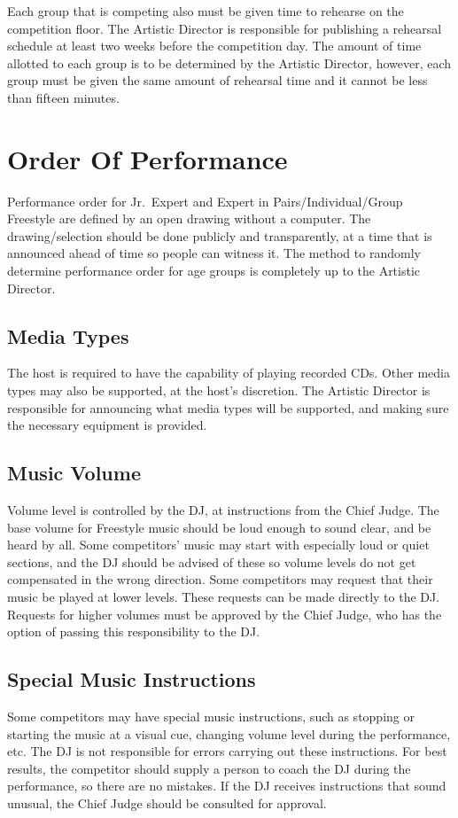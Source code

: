Each group that is competing also must be given time to rehearse on the competition floor.
The Artistic Director is responsible for publishing a rehearsal schedule at least two weeks before the competition day.
The amount of time allotted to each group is to be determined by the Artistic Director, however, each group must be given the same amount of rehearsal time and it cannot be less than fifteen minutes.

\section{Order Of Performance}
Performance order for Jr.~Expert and Expert in Pairs/Individual/Group Freestyle are defined by an open drawing without a computer.%
The drawing/selection should be done publicly and transparently, at a time that is announced ahead of time so people can witness it.
The method to randomly determine performance order for age groups is completely up to the Artistic Director.

\subsection{Media Types} %
The host is required to have the capability of playing recorded CDs.
Other media types may also be supported, at the host's discretion.
The Artistic Director is responsible for announcing what media types will be supported, and making sure the necessary equipment is provided.

\subsection{Music Volume} %
Volume level is controlled by the DJ, at instructions from the Chief Judge.
The base volume for Freestyle music should be loud enough to sound clear, and be heard by all.
Some competitors' music may start with especially loud or quiet sections, and the DJ should be advised of these so volume levels do not get compensated in the wrong direction.
Some competitors may request that their music be played at lower levels.
These requests can be made directly to the DJ.
Requests for higher volumes must be approved by the Chief Judge, who has the option of passing this responsibility to the DJ.

\subsection{Special Music Instructions}
Some competitors may have special music instructions, such as stopping or starting the music at a visual cue, changing volume level during the performance, etc.
The DJ is not responsible for errors carrying out these instructions.
For best results, the competitor should supply a person to coach the DJ during the performance, so there are no mistakes.
If the DJ receives instructions that sound unusual, the Chief Judge should be consulted for approval.

